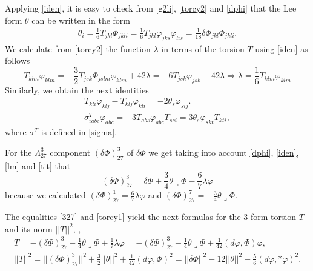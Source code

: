 \documentclass[10pt,british]{article}
\def\T{\Theta}
\def\p{{\varphi}}
\def\ph{{\Phi}}
\def\sp{{\Psi^-}}
\begin{document}
Applying \eqref{iden},  it is easy to check from \eqref{g2li},  \eqref{torcy2} and \eqref{dphi} that the Lee form $\theta$ can be written in the form %
\begin{equation}\label{tit}
\begin{split}
\theta_i=\frac16T_{jkl}\Phi_{jkli}=\frac16T_{jkl}\p_{jks}\p_{lis}=\frac1{18}\delta\ph_{jkl}\ph_{jkli}.
\end{split}
\end{equation}
We calculate from \eqref{torcy2} the function $\lambda$  in terms of the torsion $T$ using \eqref{iden} as follows
\begin{equation}\label{lmt}
T_{klm}\p_{klm}=-\frac32T_{jsk}\Phi_{jslm}\p_{klm}+42\lambda=-6T_{jsk}\p_{jsk}+42\lambda \Longrightarrow \lambda=\frac16T_{klm}\p_{klm}
\end{equation}
Similarly, we obtain the next identities
\begin{equation}\label{lmt0}
\begin{split}
T_{kli}\p_{klj}-T_{klj}\p_{kli}=-2\theta_s\p_{sij}.\\
\sigma^T_{iabc}\p_{abc}=-3T_{abs}\p_{abc}T_{sci}=3\theta_s\p_{skt}T_{kti},
\end{split}
\end{equation}
where $\sigma^T$ is defined in \eqref{sigma}.

For the $\Lambda^3_{27}$ component $(\delta\ph)^3_{27}$ of $\delta\ph$ we get  taking into account  \eqref{dphi}, \eqref{iden}, \eqref{lm} and \eqref{tit} that 
\begin{equation}\label{327}
(\delta\ph)^3_{27}=\delta\ph+\frac34\theta\lrcorner\ph-\frac67\lambda\p
\end{equation}
because we calculated $(\delta\ph)^1_{27}=\frac67\lambda\p$ and $(\delta\ph)^7_{27}=-\frac34\theta\lrcorner\ph$.

The equalities \eqref{327} and \eqref{torcy1} yield the next formulas for the 3-form torsion $T$  and its norm $||T||^2$, \cite{FI},
\begin{equation}\label{torcy3}
\begin{split}
T=-(\delta\ph)^3_{27}-\frac14\theta\lrcorner\ph+\frac17\lambda\p=-(\delta\ph)^3_{27}-\frac14\theta\lrcorner\ph+\frac1{42}(d\p,\ph)\p,
\\ ||T||^2= 
||(\delta\ph)^3_{27}||^2+\frac{3}2||\theta||^2+\frac1{42}(d\p,\ph)^2=||\delta\ph||^2-12||\theta||^2-\frac56(d\p,*\p)^2.
\end{split}
\end{equation}
\end{document}
